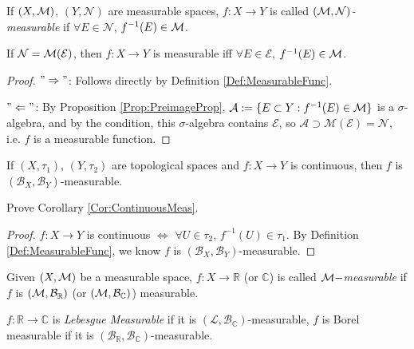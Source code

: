 \begin{defn}
    \label{Def:MeasurableFunc}
    If $(X,\mathcal{M})$, $(Y,\mathcal{N})$ are measurable spaces, 
    $f:X\rightarrow Y$ is called \textit{$(\mathcal{M},\mathcal{N})$-measurable} 
    if $\forall E\in\mathcal{N}$, $f^{-1}(E)\in\mathcal{M}$.
\end{defn}
\begin{prop}
    \label{Prop:DescribeMeasFunc}
    If $\mathcal{N}=\mathcal{M}(\mathcal{E})$, then $f:X\rightarrow Y$ is 
    measurable iff $\forall E\in\mathcal{E}$, $f^{-1}(E)\in\mathcal{M}$.
\end{prop}
\begin{proof}
    $"\Rightarrow"$: Follows directly by Definition 
    \ref{Def:MeasurableFunc}.
    
    $"\Leftarrow"$: By Proposition \ref{Prop:PreimageProp}, 
    $\mathcal{A}:=\{E\subset Y:f^{-1}(E)\in\mathcal{M}\}$ is a $\sigma$-algebra, 
    and by the condition, this $\sigma$-algebra contains $\mathcal{E}$, 
    so $\mathcal{A}\supset\mathcal{M}(\mathcal{E})=\mathcal{N}$, 
    i.e. $f$ is a measurable function.  
\end{proof}
\begin{coro}
    \label{Cor:ContinuousMeas}
    If $(X,\tau_1)$, $(Y,\tau_2)$ are topological spaces and 
    $f:X\rightarrow Y$ is continuous, then 
    $f$ is $(\mathcal{B}_{X},\mathcal{B}_{Y})$-measurable.
\end{coro}
\begin{exc}
    Prove Corollary \ref{Cor:ContinuousMeas}.
\end{exc}
\begin{proof}
    $f:X\rightarrow Y$ is continuous $\Leftrightarrow$ 
    $\forall U\in\tau_2$, $f^{-1}(U)\in\tau_1$.
    By Definition \ref{Def:MeasurableFunc}, we know
    $f$ is $(\mathcal{B}_{X},\mathcal{B}_{Y})$-measurable.
\end{proof}
\begin{defn}
    \label{Defn:Mmeasurable}
    Given $(X,\mathcal{M})$ be a measurable space, $f:X\rightarrow\mathbb{R}$ 
    (or $\mathbb{C}$) 
    is called \textit{$\mathcal{M}-$measurable} if $f$ is 
    $(\mathcal{M},\mathcal{B}_{\mathbb{R}})$ (or $(\mathcal{M},\mathcal{B}_{\mathbb{C}})$) 
    measurable.
\end{defn}
\begin{defn}
    $f:\mathbb{R}\rightarrow\mathbb{C}$ is \textit{Lebesgue Measurable} 
    if it is $(\mathcal{L},\mathcal{B}_{\mathbb{C}})$-measurable, 
    $f$ is Borel measurable if it is 
    $(\mathcal{B}_{\mathbb{R}},\mathcal{B}_{\mathbb{C}})$-measurable.
\end{defn}
